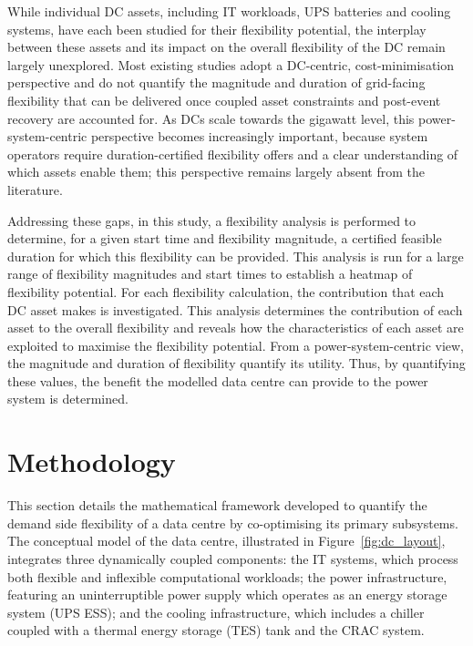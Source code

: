 \documentclass[lettersize,journal]{IEEEtran}
\providecommand{\DIFadd}[1]{{\color{blue}#1}}
\providecommand{\DIFaddbegin}{}
\providecommand{\DIFaddend}{}
\begin{document}
 \DIFaddbegin \DIFadd{While individual DC assets, including IT workloads, UPS batteries and cooling systems, have each been studied for their flexibility potential, }\DIFaddend the \DIFaddbegin \DIFadd{interplay between these assets and its impact on the overall flexibility of the DC remain largely unexplored. Most existing studies adopt a DC-centric, cost-minimisation perspective and do not quantify the magnitude and duration of grid-facing flexibility that can be delivered once coupled asset constraints and post-event recovery are accounted for. As DCs scale towards the }\DIFaddend gigawatt level,  \DIFaddbegin \DIFadd{this power-system-centric perspective becomes increasingly important, because system operators require duration-certified flexibility offers and a clear understanding of which assets enable them; this perspective remains largely absent from the literature}\DIFaddend .

Addressing these gaps, in this study, a flexibility analysis is performed to determine, for a given start time and flexibility magnitude,  \DIFaddbegin \DIFadd{a certified feasible }\DIFaddend duration for which this flexibility can be provided. This analysis is run for a large range of flexibility magnitudes and start times to establish a heatmap of flexibility potential. For each flexibility calculation, the contribution that each DC asset makes is investigated. This analysis determines the contribution of each asset to the overall flexibility and reveals how the characteristics of each asset are exploited to maximise the flexibility potential. From a power-system-centric view, the magnitude and duration of flexibility  \DIFaddbegin \DIFadd{quantify }\DIFaddend its utility. Thus, by quantifying these values, the benefit the  \DIFaddbegin \DIFadd{modelled }\DIFaddend data centre can provide to the power system is determined. 

\section{Methodology}
This section details the mathematical framework developed to quantify the  \DIFaddbegin \DIFadd{demand side }\DIFaddend flexibility of a data centre by co-optimising its primary subsystems. The conceptual model of the data centre, illustrated in Figure~\ref{fig:dc_layout}, integrates three dynamically coupled components: the IT systems, which process both flexible and inflexible computational workloads; the power infrastructure, featuring an  \DIFaddbegin \DIFadd{uninterruptible power supply }\DIFaddend which operates as an  \DIFaddbegin \DIFadd{energy storage system (UPS ESS}\DIFaddend ); and the cooling infrastructure, which includes a chiller coupled with a  \DIFaddbegin \DIFadd{thermal energy storage }\DIFaddend (TES) tank and the CRAC system. 
\end{document}
